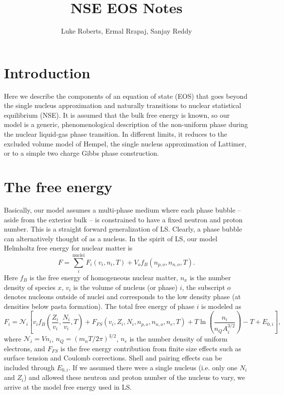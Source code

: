 \documentclass[11pt,letter]{article}
\title{NSE EOS Notes}
\author{Luke Roberts, Ermal Rrapaj, Sanjay Reddy}
\date{} %
\begin{document}
\maketitle
\tableofcontents

\section{Introduction}
Here we describe the components of an equation of state (EOS) that goes beyond
the single nucleus approximation and naturally transitions to nuclear
statistical equilibrium (NSE).  It is assumed that the bulk free energy is
known, so our model is a generic, phenomenological description of the
non-uniform phase during the nuclear liquid-gas phase transition.  In different
limits, it reduces to the excluded volume model of Hempel, the single nucleus
approximation of Lattimer, or to a simple two charge Gibbs phase construction.  

\section{The free energy}  
Basically, our model assumes a multi-phase medium where each phase bubble --
aside from the exterior bulk -- is constrained to have a fixed neutron and
proton number.  This is a straight forward generalization of LS.  Clearly, a
phase bubble can alternatively thought of as a nucleus.  In the spirit of LS,
our model Helmholtz free energy for nuclear matter is 
\begin{equation}
F = \sum_i^{\textrm{nuclei}} F_i(v_i,n_i,T) + V_o f_{B}(n_{p,o},n_{n,o},T).
\end{equation}
Here $f_B$ is the free energy of homogeneous nuclear matter, $n_x$ is the number
density of species $x$, $v_i$ is the volume of nucleus (or phase) $i$, the
subscript $o$ denotes nucleons outside of nuclei and corresponds to the low
density phase (at densities below pasta formation).  The total free energy of
phase $i$ is modeled as 
\begin{equation}
F_i = \mathcal{N}_i \left[ v_i f_B(\frac{Z_i}{v_i},\frac{N_i}{v_i},T) 
+ F_{FS}(v_i,Z_i,N_i,n_{p,o},n_{n,o},n_e,T) + T \ln \left(\frac{n_i}{n_Q A_i^{3/2}}\right) 
- T + E_{0,i}\right],
\end{equation}   
where $\mathcal{N}_i = V n_i$, $n_Q = (m_n T / 2 \pi)^{3/2}$, $n_e$ is the
number density of uniform electrons, and $F_{FS}$ is the free energy
contribution from finite size effects such as surface tension and Coulomb
corrections.  Shell and pairing effects can be included through $E_{0,i}$.  If
we assumed there were a single nucleus (i.e. only one $N_i$ and $Z_i$) and
allowed these neutron and proton number of the nucleus to vary, we arrive at the
model free energy used in LS.  
\end{document}
